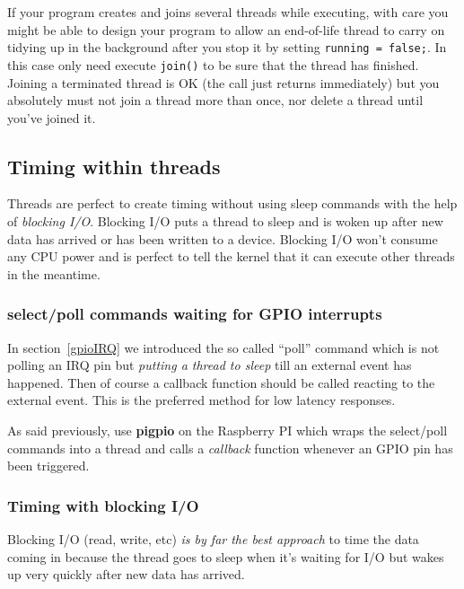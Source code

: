 \documentclass[12pt]{report}
\begin{document}
If your program creates and joins several threads while executing,
with care you might be able to design your program to allow an
end-of-life thread to carry on
tidying up in the background after you stop it by setting \texttt{running = false;}.
In this case only need execute \texttt{join()} to be sure that
the thread has finished. Joining a terminated thread is OK
(the call just returns immediately)
but you absolutely  must not join a thread more than once,
nor delete a thread until you've joined it.


\subsection{Timing within threads}
Threads are perfect to create timing without using sleep commands
with the help of \textsl{blocking I/O}. 
Blocking I/O puts a thread
to sleep and is woken up after new data has arrived or has been
written to a device. Blocking I/O won't consume any CPU power
and is perfect to tell the kernel that it can execute other threads
in the meantime.


\subsubsection{select/poll commands waiting for GPIO interrupts}
In section~\ref{gpioIRQ} we introduced the so called ``poll'' command
which is not polling an IRQ pin but \textsl{putting a thread to sleep} till an
external event has happened. Then of course a callback function should
be called reacting to the external event. This is the preferred method
for low latency responses.

As said previously, use \textbf{pigpio} on the Raspberry PI
which wraps the select/poll commands into a thread and calls a
\textsl{callback} function whenever an GPIO pin has been triggered.


\subsubsection{Timing with blocking I/O}
Blocking I/O (read, write, etc) \textsl{is by far the best approach} to time
the data coming in because the thread goes to sleep when it's waiting for
I/O but wakes up very quickly after new data has arrived.
\end{document}
